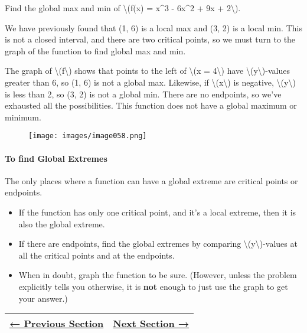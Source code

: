 Find the global max and min of \textbackslash{}(f(x) = x\^{}3 - 6x\^{}2
+ 9x + 2\textbackslash{}).

We have previously found that (1, 6) is a local max and (3, 2) is a
local min. This is not a closed interval, and there are two critical
points, so we must turn to the graph of the function to find global max
and min.

The graph of \textbackslash{}(f\textbackslash{}) shows that points to
the left of \textbackslash{}(x = 4\textbackslash{}) have
\textbackslash{}(y\textbackslash{})-values greater than 6, so (1, 6) is
not a global max. Likewise, if \textbackslash{}(x\textbackslash{}) is
negative, \textbackslash{}(y\textbackslash{}) is less than 2, so (3, 2)
is not a global min. There are no endpoints, so we've exhausted all the
possibilities. This function does not have a global maximum or minimum.

\begin{figure}
\centering
\texttt{[image: images/image058.png]}
\caption{}
\end{figure}

\hypertarget{to-find-global-extremes}{%
\paragraph{To find Global Extremes}\label{to-find-global-extremes}}

The only places where a function can have a global extreme are critical
points or endpoints.

\begin{itemize}
\tightlist
\item
  If the function has only one critical point, and it's a local extreme,
  then it is also the global extreme.
\item
  If there are endpoints, find the global extremes by comparing
  \textbackslash{}(y\textbackslash{})-values at all the critical points
  and at the endpoints.
\item
  When in doubt, graph the function to be sure. (However, unless the
  problem explicitly tells you otherwise, it is \textbf{not} enough to
  just use the graph to get your answer.)
\end{itemize}

\begin{longtable}[]{@{}ll@{}}
\toprule
\endhead
\href{section2-6.php}{← Previous Section} & \href{section2-8.php}{Next
Section →}\tabularnewline
\bottomrule
\end{longtable}
